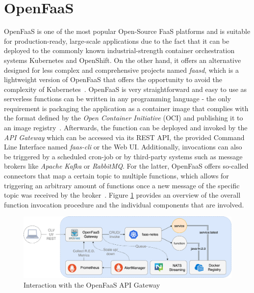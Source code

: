 \section{OpenFaaS}
OpenFaaS is one of the most popular Open-Source FaaS platforms and is suitable for production-ready, large-scale applications due to the fact that it can be deployed to the commonly known industrial-strength container orchestration systems Kubernetes and OpenShift. On the other hand, it offers an alternative designed for less complex and comprehensive projects named \textit{faasd}, which is a lightweight version of OpenFaaS that offers the opportunity to avoid the complexity of Kubernetes~\parencite{openfaas-deployment}. OpenFaaS is very straightforward and easy to use as serverless functions can be written in any programming language - the only requirement is packaging the application as a container image that complies with the format defined by the \textit{Open Container Initiative} (OCI) and publishing it to an image registry~\parencite{openfaas-intro}. Afterwards, the function can be deployed and invoked by the \textit{API Gateway} which can be accessed via its REST API, the provided Command Line Interface named \textit{faas-cli} or the Web UI. Additionally, invocations can also be triggered by a scheduled cron-job or by third-party systems such as message brokers like \textit{Apache Kafka} or \textit{RabbitMQ}. For the latter, OpenFaaS offers so-called connectors that map a certain topic to multiple functions, which allows for triggering an arbitrary amount of functions once a new message of the specific topic was received by the broker~\parencite{openfaas-triggers}. Figure \ref{fig:openfaas-gateway} provides an overview of the overall function invocation procedure and the individual components that are involved.

\begin{figure}[h]
    \centering
    \includegraphics[width=1\textwidth]{./figures/of-workflow.png}
    \caption{Interaction with the OpenFaaS API Gateway~\parencite{openfaas-stack}}
    \label{fig:openfaas-gateway}
\end{figure}